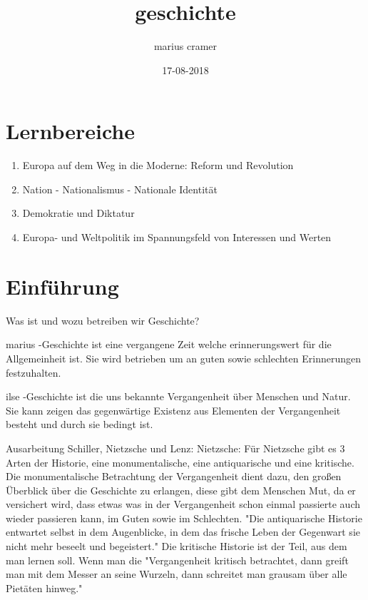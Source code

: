 \documentclass{article}
\title{geschichte}
\author{marius cramer}
\date{17-08-2018}
\begin{document}
\maketitle

\section{Lernbereiche}
\begin{enumerate}
  \item Europa auf dem Weg in die Moderne: Reform und Revolution
  \item Nation - Nationalismus - Nationale Identität
  \item Demokratie und Diktatur
  \item Europa- und Weltpolitik im Spannungsfeld von Interessen und Werten
\end{enumerate}

\section{Einführung}
Was ist und wozu betreiben wir Geschichte?

marius -\guilsinglright  Geschichte ist eine vergangene Zeit welche erinnerungswert für die Allgemeinheit ist. Sie wird betrieben um an guten sowie schlechten Erinnerungen festzuhalten.

ilse -\guilsinglright  Geschichte ist die uns bekannte Vergangenheit über Menschen und Natur. Sie kann zeigen das gegenwärtige Existenz aus Elementen der Vergangenheit besteht und durch sie bedingt ist.

\par

Ausarbeitung \textcolor{myGreen}{Schiller}, \textcolor{myRed}{Nietzsche} und \textcolor{myBlue}{Lenz}:
\textcolor{myRed}{Nietzsche}: Für Nietzsche gibt es 3 Arten der Historie, eine monumentalische, eine antiquarische und eine kritische. Die monumentalische Betrachtung der Vergangenheit dient dazu, den großen Überblick über die Geschichte zu erlangen, diese gibt dem Menschen Mut, da er versichert wird, dass etwas was in der Vergangenheit schon einmal passierte auch wieder passieren kann, im Guten sowie im Schlechten.
"Die antiquarische Historie entwartet selbst in dem Augenblicke, in dem das frische Leben der Gegenwart sie nicht mehr beseelt und begeistert."
Die kritische Historie ist der Teil, aus dem man lernen soll. Wenn man die "Vergangenheit kritisch betrachtet, dann greift man mit dem Messer an seine Wurzeln, dann schreitet man grausam über alle Pietäten hinweg."
\end{document}
